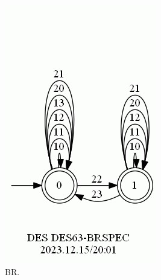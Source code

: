 \documentclass{article}
\begin{document}
\begin{figure}[h!]
\begin{subfigure}{0.2\linewidth}
    \includegraphics[width=\linewidth]{assets/DES63-BRSPEC.jpg}
    \caption{BR.}
  \end{subfigure}
  \begin{subfigure}{0.6\linewidth}

\end{subfigure}
\end{figure}
\end{document}
